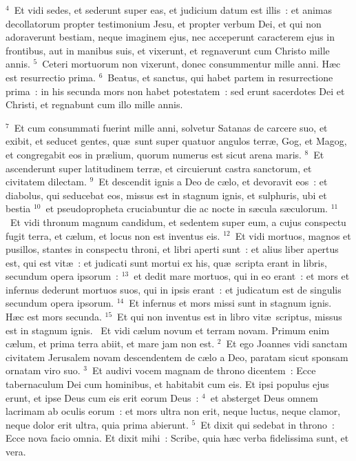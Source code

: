 ${}^{4}$~Et vidi sedes, et sederunt super eas, et judicium datum est illis~: et animas decollatorum propter testimonium Jesu, et propter verbum Dei, et qui non adoraverunt bestiam, neque imaginem ejus, nec acceperunt caracterem ejus in frontibus, aut in manibus suis, et vixerunt, et regnaverunt cum Christo mille annis.
${}^{5}$~Ceteri mortuorum non vixerunt, donec consummentur mille anni. H\ae c est resurrectio prima.
${}^{6}$~Beatus, et sanctus, qui habet partem in resurrectione prima~: in his secunda mors non habet potestatem~: sed erunt sacerdotes Dei et Christi, et regnabunt cum illo mille annis.


${}^{7}$~Et cum consummati fuerint mille anni, solvetur Satanas de carcere suo, et exibit, et seducet gentes, qu\ae\ sunt super quatuor angulos terr\ae , Gog, et Magog, et congregabit eos in pr\ae lium, quorum numerus est sicut arena maris.
${}^{8}$~Et ascenderunt super latitudinem terr\ae , et circuierunt castra sanctorum, et civitatem dilectam.
${}^{9}$~Et descendit ignis a Deo de c\ae lo, et devoravit eos~: et diabolus, qui seducebat eos, missus est in stagnum ignis, et sulphuris, ubi et bestia
${}^{10}$~et pseudopropheta cruciabuntur die ac nocte in s\ae cula s\ae culorum.
${}^{11}$~Et vidi thronum magnum candidum, et sedentem super eum, a cujus conspectu fugit terra, et c\ae lum, et locus non est inventus eis.
${}^{12}$~Et vidi mortuos, magnos et pusillos, stantes in conspectu throni, et libri aperti sunt~: et alius liber apertus est, qui est vit\ae~: et judicati sunt mortui ex his, qu\ae\ scripta erant in libris, secundum opera ipsorum~:
${}^{13}$~et dedit mare mortuos, qui in eo erant~: et mors et infernus dederunt mortuos suos, qui in ipsis erant~: et judicatum est de singulis secundum opera ipsorum.
${}^{14}$~Et infernus et mors missi sunt in stagnum ignis. H\ae c est mors secunda.
${}^{15}$~Et qui non inventus est in libro vit\ae\ scriptus, missus est in stagnum ignis.
~Et vidi c\ae lum novum et terram novam. Primum enim c\ae lum, et prima terra abiit, et mare jam non est.
${}^{2}$~Et ego Joannes vidi sanctam civitatem Jerusalem novam descendentem de c\ae lo a Deo, paratam sicut sponsam ornatam viro suo.
${}^{3}$~Et audivi vocem magnam de throno dicentem~: Ecce tabernaculum Dei cum hominibus, et habitabit cum eis. Et ipsi populus ejus erunt, et ipse Deus cum eis erit eorum Deus~:
${}^{4}$~et absterget Deus omnem lacrimam ab oculis eorum~: et mors ultra non erit, neque luctus, neque clamor, neque dolor erit ultra, quia prima abierunt.
${}^{5}$~Et dixit qui sedebat in throno~: Ecce nova facio omnia. Et dixit mihi~: Scribe, quia h\ae c verba fidelissima sunt, et vera.
